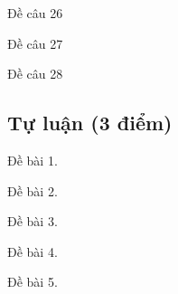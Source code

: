 \begin{ex}
	Đề câu 26
	\choice
	{\True }
	{}
	{}
	{}	
\end{ex}


\begin{ex}
	Đề câu 27
	\choice
	{\True }
	{}
	{}
	{}	
\end{ex}


\begin{ex}
	Đề câu 28
	\choice
	{\True }
	{}
	{}
	{}	
\end{ex}




\setcounter{bt}{0}
\subsection{Tự luận (3 điểm)}

\begin{bt}
	Đề bài 1.
\end{bt}

\begin{bt}
Đề bài 2.
\end{bt}

\begin{bt}
Đề bài 3.
\end{bt}

\begin{bt}
Đề bài 4.
\end{bt}

\begin{bt}
Đề bài 5.
\end{bt}
